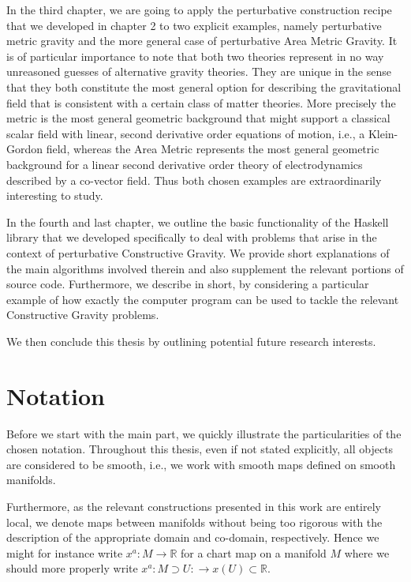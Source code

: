 \documentclass[a4paper,12pt, DIV=14, BCOR=5mm, twoside, headsepline, numbers=noenddot]{scrbook}
\begin{document}
In the third chapter, we are going to apply the perturbative construction recipe that we developed in chapter 2 to two explicit examples, namely perturbative metric gravity and the more general case of perturbative Area Metric Gravity. It is of particular importance to note that both two theories represent in no way unreasoned guesses of alternative gravity theories. They are unique in the sense that they both constitute the most general option for describing the gravitational field that is consistent with a certain class of matter theories. More precisely the metric is the most general geometric background that might support a classical scalar field with linear, second derivative order equations of motion, i.e., a Klein-Gordon field, whereas the Area Metric represents the most general geometric background for a linear second derivative order theory of electrodynamics described by a co-vector field. Thus both chosen examples are extraordinarily interesting to study.

In the fourth and last chapter, we outline the basic functionality of the Haskell library that we developed specifically to deal with problems that arise in the context of perturbative Constructive Gravity. We provide short explanations of the main algorithms involved therein and also supplement the relevant portions of source code. Furthermore, we describe in short, by considering a particular example of how exactly the computer program can be used to tackle the relevant Constructive Gravity problems.

We then conclude this thesis by outlining potential future research interests.
\section*{Notation}

Before we start with the main part, we quickly illustrate the particularities of the chosen notation. Throughout this thesis, even if not stated explicitly, all objects are considered to be smooth, i.e., we work with smooth maps defined on smooth manifolds. 

Furthermore, as the relevant constructions presented in this work are entirely local, we denote maps between manifolds without being too rigorous with the description of the appropriate domain and co-domain, respectively. Hence we might for instance write $x^a : M
\rightarrow \mathbb{R}$ for a chart map on a manifold $M$ where we should more properly write $x^a : M \supset U : \rightarrow x(U) \subset \mathbb{R} $. 
\end{document}
